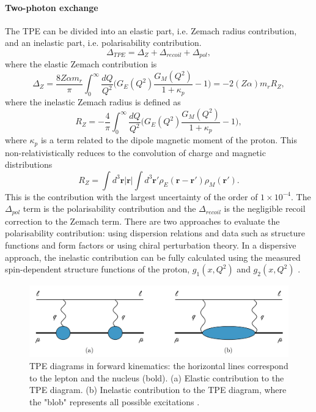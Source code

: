 \documentclass[12pt]{article}
\begin{document}
\paragraph{Two-photon exchange}
The TPE can be divided into an elastic part, i.e. Zemach radius contribution, and an inelastic part, i.e. polarisability contribution. \begin{equation}
\Delta_{TPE} = \Delta_{Z} + \Delta_{recoil} + \Delta_{pol},
\end{equation}
where the elastic Zemach contribution is
\begin{equation}
\Delta_{Z} = \frac{8Z{\alpha{m_r}}}{\pi} \int_0^{\infty} \frac{dQ}{Q^2} \Bigg( G_{E}(Q^2) \frac{G_M(Q^2)}{1+\kappa_p} - 1 \Bigg) = -2 (Z{\alpha}) m_r R_Z,
\end{equation}
where the inelastic Zemach radius is defined as 
\begin{equation}
R_Z = - \frac{4}{\pi} \int_0^{\infty} \frac{dQ}{Q^2} \Bigg( G_E(Q^2) \frac{G_M(Q^2)}{1 + \kappa_p} - 1 \Bigg),
\end{equation}
where ${\kappa}_p$ is a term related to the dipole magnetic moment of the proton. This non-relativistically reduces to the convolution of charge and magnetic distributions
\begin{equation}
R_Z = \int d^3 \bm{r} |\bm{r}| \int d^3 \bm{r'} \rho_{E} (\bm{r} - \bm{r'}) \rho_{M} (\bm{r'}).
\end{equation}
This is the contribution with the largest uncertainty of the order of $1 \times 10^{-4}$. The ${\Delta}_{pol}$ term is the polarisability contribution and the ${\Delta}_{recoil}$ is the negligible recoil correction to the Zemach term. There are two approaches to evaluate the polarisability contribution: using dispersion relations and data such as structure functions and form factors or using chiral perturbation theory. In a dispersive approach, the inelastic contribution can be fully calculated using the measured spin-dependent structure functions of the proton, $g_1(x,Q^2)$ and $g_2(x,Q^2)$ \cite{proposal}.
\begin{figure}[h]
\centering
\includegraphics[width=1.0\textwidth]{img/tpediagramms}
\caption{TPE diagrams in forward kinematics: the horizontal lines correspond to the lepton and the nucleus (bold). (a) Elastic contribution to the TPE diagram. (b) Inelastic contribution to the TPE diagram, where the "blob" represents all possible excitations \cite{franziska}.}
\label{fig:tpediagram}
\end{figure} 
\end{document}
